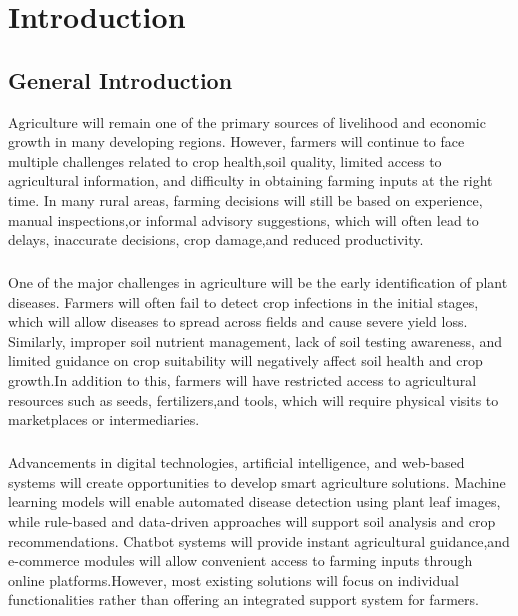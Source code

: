 \chapter{Introduction}

\section{General Introduction}Agriculture will remain one of the primary sources of livelihood and economic growth in many developing regions. However, farmers will continue to face multiple challenges related to crop health,soil quality, limited access to agricultural information, and difficulty in obtaining farming inputs at the right time. In many rural areas, farming decisions will still be based on experience, manual inspections,or informal advisory suggestions, which will often lead to delays, inaccurate decisions, crop damage,and reduced productivity.

\paragraph{}One of the major challenges in agriculture will be the early identification of plant diseases. Farmers will often fail to detect crop infections in the initial stages, which will allow diseases to spread across fields and cause severe yield loss. Similarly, improper soil nutrient management, lack of soil testing awareness, and limited guidance on crop suitability will negatively affect soil health and crop growth.In addition to this, farmers will have restricted access to agricultural resources such as seeds, fertilizers,and tools, which will require physical visits to marketplaces or intermediaries.
\cite{1}

\paragraph{} Advancements in digital technologies, artificial intelligence, and web-based systems will create opportunities to develop smart agriculture solutions. Machine learning models will enable automated disease detection using plant leaf images, while rule-based and data-driven approaches will support soil analysis and crop recommendations. Chatbot systems will provide instant agricultural guidance,and e-commerce modules will allow convenient access to farming inputs through online platforms.However, most existing solutions will focus on individual functionalities rather than offering an integrated support system for farmers.\cite{2}

